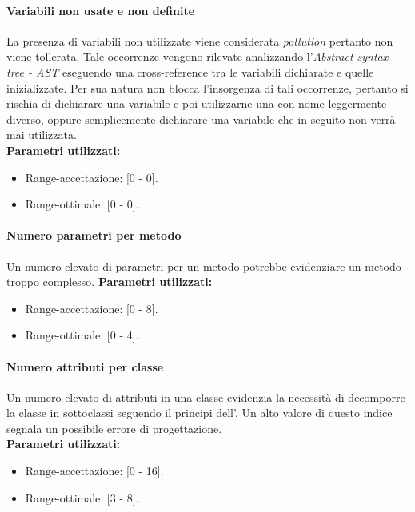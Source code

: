 			\paragraph{Variabili non usate e non definite}
			La presenza di variabili non utilizzate viene considerata \emph{pollution} pertanto non viene tollerata. Tale occorrenze vengono rilevate analizzando l'\emph{Abstract syntax tree - AST} eseguendo una cross-reference tra le variabili dichiarate e quelle inizializzate. Per sua natura  non blocca l'insorgenza di tali occorrenze, pertanto si rischia  di dichiarare una variabile e poi utilizzarne una con nome leggermente diverso, oppure semplicemente dichiarare una variabile che in seguito non verrà mai utilizzata.\\
			\textbf{Parametri utilizzati:}
			\begin{itemize}
				\item Range-accettazione: [0 - 0].
				\item Range-ottimale: [0 - 0].
			\end{itemize}
			
			\paragraph{Numero parametri per metodo}
			Un numero elevato di parametri per un metodo potrebbe evidenziare un metodo troppo complesso.
			\textbf{Parametri utilizzati:}
			\begin{itemize}
				\item Range-accettazione: [0 - 8].
				\item Range-ottimale: [0 - 4].
			\end{itemize}
			
			\paragraph{Numero attributi per classe}
			Un numero elevato di attributi in una classe evidenzia la necessità di decomporre la classe in sottoclassi seguendo il principi dell'. Un alto valore di questo indice segnala un possibile errore di progettazione.\\
			\textbf{Parametri utilizzati:}
			\begin{itemize}
				\item Range-accettazione: [0 - 16].
				\item Range-ottimale: [3 - 8].
			\end{itemize}
			
